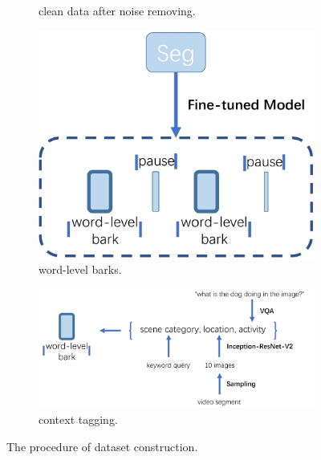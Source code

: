 \begin{figure}[ht]
\begin{subfigure}[t]{0.48\columnwidth}
	\caption{clean data after noise removing.}
        \label{fig:clean}
\end{subfigure}
\begin{subfigure}[t]{0.48\columnwidth}
        \centering
        \includegraphics[width=0.98\columnwidth]{images/image3.jpg}
	\caption{word-level barks.}
        \label{fig:word}
\end{subfigure}
\begin{subfigure}[t]{0.7\columnwidth}
        \centering
        \includegraphics[width=0.98\columnwidth]{images/image4.jpg}
	\caption{context tagging.}
        \label{fig:context}
\end{subfigure}
\caption{The procedure of dataset construction.}
\label{fig:methodpic}
\end{figure}

 
